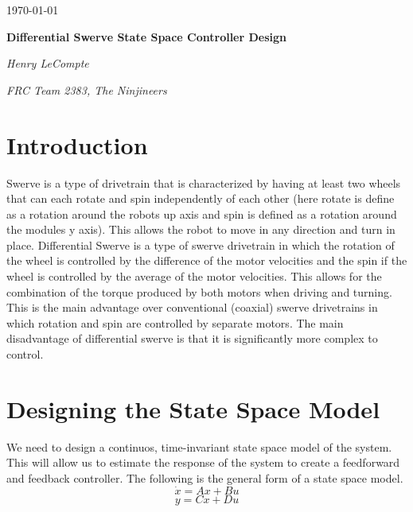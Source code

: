 \documentclass{scrartcl}
\begin{document}
\begin{titlepage}
    \centering
    {\large \today\par}
    \vfill

    {\huge\bfseries Differential Swerve State Space Controller Design\par}
    \vfill

    {\Large\itshape Henry LeCompte}\par
    {\itshape FRC Team 2383, The Ninjineers}\par
    \vspace{1.5cm}

    \vfill
\end{titlepage}

\newpage

\doublespacing
\tableofcontents
\singlespacing

\newpage

\doublespacing

\section{Introduction}
Swerve is a type of drivetrain that is characterized by having at least two wheels that can each rotate and spin independently of each other (here rotate is define as a rotation around the robots up axis and spin is defined as a rotation around the modules y axis). This allows the robot to move in any direction and turn in place. Differential Swerve is a type of swerve drivetrain in which the rotation of the wheel is controlled by the difference of the motor velocities and the spin if the wheel is controlled by the average of the motor velocities. This allows for the combination of the torque produced by both motors when driving and turning. This is the main advantage over conventional (coaxial) swerve drivetrains in which rotation and spin are controlled by separate motors. The main disadvantage of differential swerve is that it is significantly more complex to control.

\newpage
\section{Designing the State Space Model}

We need to design a continuos, time-invariant state space model of the system. This will allow us to estimate the response of the system to create a feedforward and feedback controller. The following is the general form of a state space model.
\begin{equation} \label{state-change}
    \dot{x} = Ax + Bu
\end{equation}
\begin{equation} \label{output}
    y = Cx + Du
\end{equation}
\end{document}
